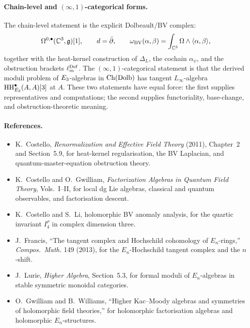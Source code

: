 \paragraph{Chain-level and \((\infty,1)\)-categorical forms.}
The chain-level statement is the explicit Dolbeault/BV complex:
\[
  \Omega^{0,\bullet}(\mathbb{C}^3,\mathfrak{g})[1],
  \qquad
  d=\bar\partial,
  \qquad
  \omega_{\mathrm{BV}}(\alpha,\beta)
  =
  \int_{\mathbb{C}^3}\Omega\wedge\langle\alpha,\beta\rangle,
\]
together with the heat-kernel construction of \(\Delta_L\), the
cochain \(\alpha_\psi\), and the obstruction brackets
\(\ell_m^{\mathrm{Def}}\). The \((\infty,1)\)-categorical statement is that the
derived moduli problem of \(E_3\)-algebras in \(\mathrm{Ch}(\mathrm{Dolb})\) has
tangent \(L_\infty\)-algebra
\(\mathrm{HH}^\bullet_{E_3}(A,A)[3]\) at \(A\). These two statements have
equal force: the first supplies representatives and computations; the
second supplies functoriality, base-change, and obstruction-theoretic
meaning.

\paragraph{References.}
\begin{itemize}
  \item K.~Costello, \emph{Renormalization and Effective Field Theory}
  (2011), Chapter~2 and Section~5.9, for heat-kernel regularisation,
  the BV Laplacian, and quantum-master-equation obstruction theory.
  \item K.~Costello and O.~Gwilliam, \emph{Factorization Algebras in
  Quantum Field Theory}, Vols.~I--II, for local dg Lie algebras,
  classical and quantum observables, and factorisation descent.
  \item K.~Costello and S.~Li, holomorphic BV anomaly analysis, for the
  quartic invariant \(I_4^\rho\) in complex dimension three.
  \item J.~Francis, ``The tangent complex and Hochschild cohomology of
  \(E_n\)-rings,'' \emph{Compos.\ Math.} 149 (2013), for the
  \(E_n\)-Hochschild tangent complex and the \(n\)-shift.
  \item J.~Lurie, \emph{Higher Algebra}, Section~5.3, for formal
  moduli of \(E_n\)-algebras in stable symmetric monoidal categories.
  \item O.~Gwilliam and B.~Williams, ``Higher Kac--Moody algebras and
  symmetries of holomorphic field theories,'' for holomorphic
  factorisation algebras and holomorphic \(E_n\)-structures.
\end{itemize}
